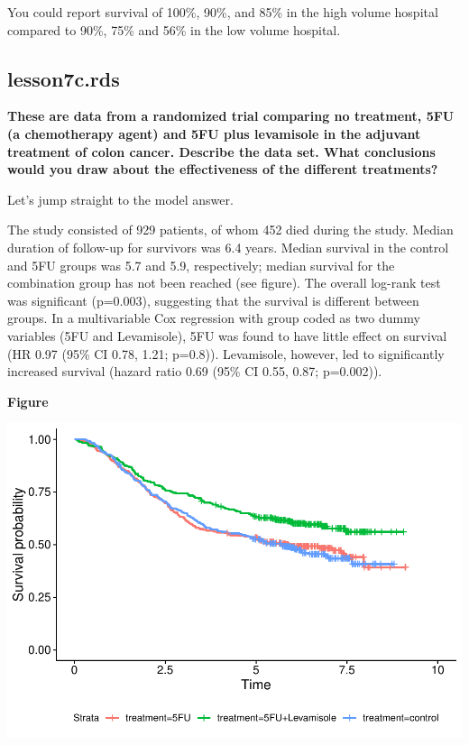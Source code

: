 \documentclass[]{book}
\begin{document}
You could report survival of 100\%, 90\%, and 85\% in the high volume hospital compared to 90\%, 75\% and 56\% in the low volume hospital.

\hypertarget{lesson7c.rds}{%
\subsection{lesson7c.rds}\label{lesson7c.rds}}

\textbf{These are data from a randomized trial comparing no treatment, 5FU (a chemotherapy agent) and 5FU plus levamisole in the adjuvant treatment of colon cancer. Describe the data set. What conclusions would you draw about the effectiveness of the different treatments?}

Let's jump straight to the model answer.

The study consisted of 929 patients, of whom 452 died during the study. Median duration of follow-up for survivors was 6.4 years. Median survival in the control and 5FU groups was 5.7 and 5.9, respectively; median survival for the combination group has not been reached (see figure). The overall log-rank test was significant (p=0.003), suggesting that the survival is different between groups. In a multivariable Cox regression with group coded as two dummy variables (5FU and Levamisole), 5FU was found to have little effect on survival (HR 0.97 (95\% CI 0.78, 1.21; p=0.8)). Levamisole, however, led to significantly increased survival (hazard ratio 0.69 (95\% CI 0.55, 0.87; p=0.002)).

\textbf{Figure}

\includegraphics{09-answers_files/figure-latex/week7t-1.pdf}
\end{document}
